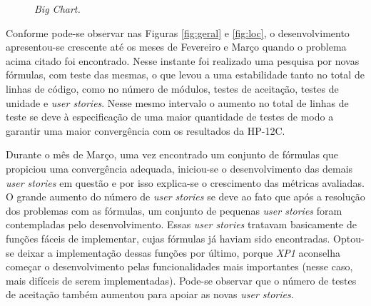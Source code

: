 \begin{figure}[!h]
 \caption{\it Big Chart.} \label{fig:bigchart}
\end{figure}

Conforme pode-se observar nas Figuras \ref{fig:geral} e \ref{fig:loc}, o desenvolvimento apresentou-se crescente
 até os meses de Fevereiro e Março quando o problema acima citado foi encontrado. Nesse instante foi 
realizado uma pesquisa por novas fórmulas, com teste das mesmas, o que levou a uma estabilidade tanto no 
total de linhas de código, como no número de módulos, testes de aceitação, testes de unidade e 
\textit{user stories}. Nesse mesmo intervalo o aumento no total de linhas de teste se deve à especificação
 de uma maior quantidade de testes de modo a garantir uma maior convergência com os resultados da HP-12C.

Durante o mês de Março, uma vez encontrado um conjunto de fórmulas que propiciou uma convergência adequada, 
iniciou-se o desenvolvimento das demais \textit{user stories} em questão e por isso explica-se o crescimento
 das métricas avaliadas. O grande aumento do número de \textit{user stories} se deve ao fato que após a
resolução dos problemas com as fórmulas, um conjunto de pequenas \textit{user stories} foram contempladas pelo
desenvolvimento. Essas \textit{user stories} tratavam basicamente de funções fáceis de implementar, cujas
fórmulas já haviam sido encontradas. Optou-se deixar a implementação dessas funções por último, porque \textit{XP1}
aconselha começar o desenvolvimento pelas funcionalidades mais importantes (nesse caso, mais difíceis de serem 
implementadas). Pode-se observar que o número de testes de aceitação também aumentou para apoiar as 
novas \textit{user stories}.

